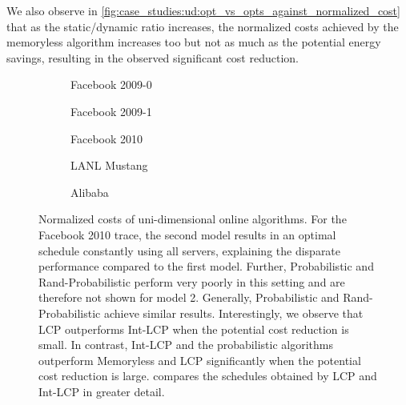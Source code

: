 We also observe in \cref{fig:case_studies:ud:opt_vs_opts_against_normalized_cost} that as the static/dynamic ratio increases, the normalized costs achieved by the memoryless algorithm increases too but not as much as the potential energy savings, resulting in the observed significant cost reduction.

\begin{figure}
    \begin{subfigure}[b]{.3425\linewidth}
    \resizebox{\textwidth}{!}{}
    \caption{Facebook 2009-0}
    \end{subfigure}
    \begin{subfigure}[b]{.32\linewidth}
    \resizebox{\textwidth}{!}{}
    \caption{Facebook 2009-1}
    \end{subfigure}
    \begin{subfigure}[b]{.32\linewidth}
    \resizebox{\textwidth}{!}{}
    \caption{Facebook 2010}
    \end{subfigure}
    \par\bigskip
    \begin{subfigure}[b]{.50\linewidth}
    \resizebox{\textwidth}{!}{}
    \caption{LANL Mustang}
    \end{subfigure}
    \begin{subfigure}[b]{.47\linewidth}
    \resizebox{\textwidth}{!}{}
    \caption{Alibaba}
    \end{subfigure}
    \caption{Normalized costs of uni-dimensional online algorithms. For the Facebook 2010 trace, the second model results in an optimal schedule constantly using all servers, explaining the disparate performance compared to the first model. Further, Probabilistic and Rand-Probabilistic perform very poorly in this setting and are therefore not shown for model 2. Generally, Probabilistic and Rand-Probabilistic achieve similar results. Interestingly, we observe that LCP outperforms Int-LCP when the potential cost reduction is small. In contrast, Int-LCP and the probabilistic algorithms outperform Memoryless and LCP significantly when the potential cost reduction is large.  compares the schedules obtained by LCP and Int-LCP in greater detail.}\label{fig:case_studies:ud:normalized_cost}
\end{figure}

